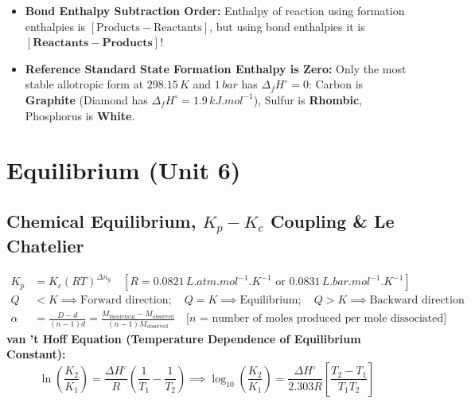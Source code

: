 \documentclass[11pt,a4paper]{article}
\begin{document}
\begin{trapbox}
\begin{itemize}
  \item \textbf{Bond Enthalpy Subtraction Order:} Enthalpy of reaction using formation enthalpies is $[\text{Products} - \text{Reactants}]$, but using bond enthalpies it is $[\mathbf{Reactants} - \mathbf{Products}]$!
  \item \textbf{Reference Standard State Formation Enthalpy is Zero:} Only the most stable allotropic form at $298.15\,\si{K}$ and $1\,\si{bar}$ has $\Delta_f H^\circ = 0$: Carbon is \textbf{Graphite} (Diamond has $\Delta_f H^\circ = 1.9\,\si{kJ.mol^{-1}}$), Sulfur is \textbf{Rhombic}, Phosphorus is \textbf{White}.
\end{itemize}
\end{trapbox}

\newpage

\section{Equilibrium (Unit 6)}

\subsection{Chemical Equilibrium, $K_p-K_c$ Coupling \& Le Chatelier}

\begin{formulabox}
\begin{align}
  K_p &= K_c (R T)^{\Delta n_g} \quad \left[R = 0.0821\,\si{L.atm.mol^{-1}.K^{-1}} \text{ or } 0.0831\,\si{L.bar.mol^{-1}.K^{-1}}\right] \\
  Q &< K \implies \text{Forward direction}; \quad Q = K \implies \text{Equilibrium}; \quad Q > K \implies \text{Backward direction} \\
  \alpha &= \frac{D - d}{(n - 1)d} = \frac{M_{\text{theoretical}} - M_{\text{observed}}}{(n - 1)M_{\text{observed}}} \quad \text{[$n$ = number of moles produced per mole dissociated]}
\end{align}
\textbf{van 't Hoff Equation (Temperature Dependence of Equilibrium Constant):}
\begin{equation}
  \ln\left(\frac{K_2}{K_1}\right) = \frac{\Delta H^\circ}{R}\left(\frac{1}{T_1} - \frac{1}{T_2}\right) \implies \log_{10}\left(\frac{K_2}{K_1}\right) = \frac{\Delta H^\circ}{2.303 R}\left[\frac{T_2 - T_1}{T_1 T_2}\right]
\end{equation}
\end{formulabox}
\end{document}

